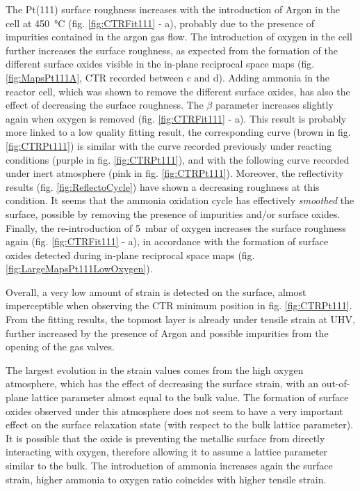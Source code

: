 The Pt(111) surface roughness increases with the introduction of Argon in the cell at \qty{450}{\degreeCelsius} (fig. \ref{fig:CTRFit111} - a), probably due to the presence of impurities contained in the argon gas flow.
The introduction of oxygen in the cell further increases the surface roughness, as expected from the formation of the different surface oxides visible in the in-plane reciprocal space maps (fig. \ref{fig:MapsPt111A}, CTR recorded between c and d).
Adding ammonia in the reactor cell, which was shown to remove the different surface oxides, has also the effect of decreasing the surface roughness.
The $\beta$ parameter increases slightly again when oxygen is removed (fig. \ref{fig:CTRFit111} - a).
This result is probably more linked to a low quality fitting result, the corresponding curve (brown in fig. \ref{fig:CTRPt111}) is similar with the curve recorded previously under reacting conditions (purple in fig. \ref{fig:CTRPt111}), and with the following curve recorded under inert atmosphere (pink in fig. \ref{fig:CTRPt111}).
Moreover, the reflectivity results (fig. \ref{fig:ReflectoCycle}) have shown a decreasing roughness at this condition.
It seems that the ammonia oxidation cycle has effectively \textit{smoothed} the surface, possible by removing the presence of impurities and/or surface oxides.
Finally, the re-introduction of \qty{5}{\milli\bar} of oxygen increases the surface roughness again (fig. \ref{fig:CTRFit111} - a), in accordance with the formation of surface oxides detected during in-plane reciprocal space maps (fig. \ref{fig:LargeMapsPt111LowOxygen}).

Overall, a very low amount of strain is detected on the surface, almost imperceptible when observing the CTR minimum position in fig. \ref{fig:CTRPt111}.
From the fitting results, the topmost layer is already under tensile strain at UHV, further increased by the presence of Argon and possible impurities from the opening of the gas valves.

The largest evolution in the strain values comes from the high oxygen atmosphere, which has the effect of decreasing the surface strain, with an out-of-plane lattice parameter almost equal to the bulk value.
The formation of surface oxides observed under this atmosphere does not seem to have a very important effect on the surface relaxation state (with respect to the bulk lattice parameter).
It is possible that the oxide is preventing the metallic surface from directly interacting with oxygen, therefore allowing it to assume a lattice parameter similar to the bulk.
The introduction of ammonia increases again the surface strain, higher ammonia to oxygen ratio coincides with higher tensile strain.

